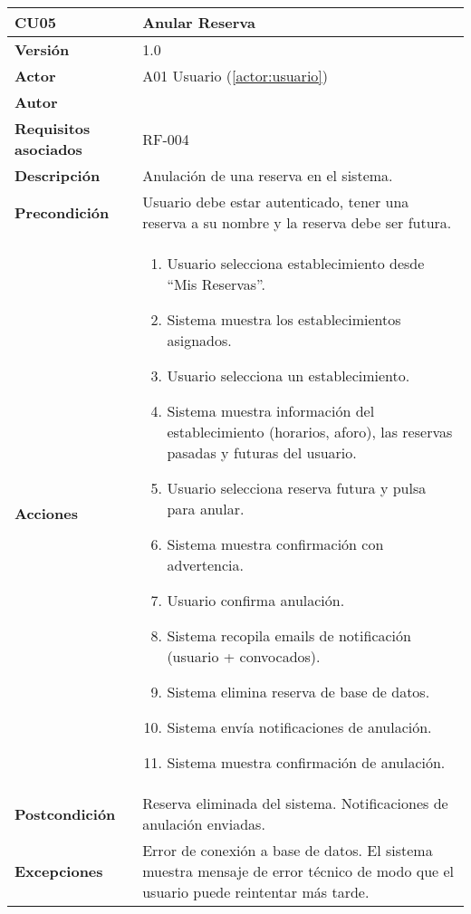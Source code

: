 \begin{table}[H]
	\centering
	\begin{tabularx}{\linewidth}{ p{} p{} }
		\toprule
		\textbf{CU05}    & \textbf{Anular Reserva} \\
		\toprule
		\textbf{Versión}              & 1.0    \\
		\textbf{Actor}                & A01 Usuario (\ref{actor:usuario}) \\
		\textbf{Autor}                & \nombre \\
		\textbf{Requisitos asociados} & RF-004 \\
		\textbf{Descripción}          & Anulación de una reserva en el sistema. \\
		\textbf{Precondición}         & Usuario debe estar autenticado, tener una reserva a su nombre y la reserva debe ser futura. \\
		\textbf{Acciones}             &
		\begin{enumerate}
			\def\labelenumi{\arabic{enumi}.}
			\tightlist
			\item Usuario selecciona establecimiento desde ``Mis Reservas''.
            \item Sistema muestra los establecimientos asignados.
            \item Usuario selecciona un establecimiento.
            \item Sistema muestra información del establecimiento (horarios, aforo), las reservas pasadas y futuras del usuario.
            \item Usuario selecciona reserva futura y pulsa para anular.
            \item Sistema muestra confirmación con advertencia.
            \item Usuario confirma anulación.
            \item Sistema recopila emails de notificación (usuario + convocados).
            \item Sistema elimina reserva de base de datos.
            \item Sistema envía notificaciones de anulación.
            \item Sistema muestra confirmación de anulación.
		\end{enumerate}\\
		\textbf{Postcondición}        & Reserva eliminada del sistema. Notificaciones de anulación enviadas.\\
		\textbf{Excepciones}          & Error de conexión a base de datos. El sistema muestra mensaje de error técnico de modo que el usuario puede reintentar más tarde.\\

\end{tabularx}
\end{table}
